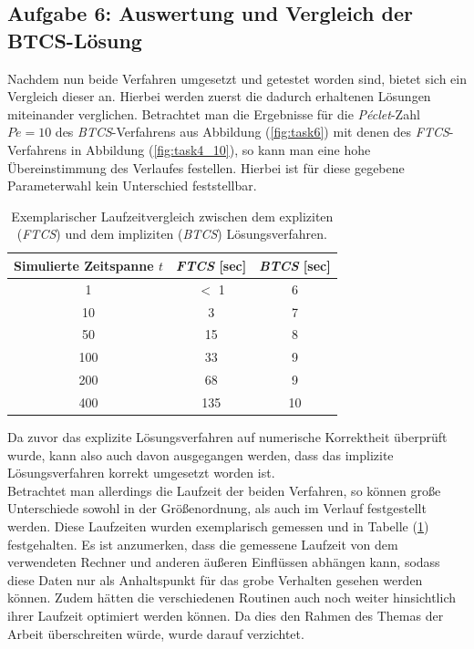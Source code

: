 \documentclass[12pt,a4paper,titlepage,headinclude,bibtotoc]{scrartcl}
\begin{document}
\subsection{Aufgabe 6: Auswertung und Vergleich der BTCS-Lösung}
\label{sec:disc_speed_comparison}
Nachdem nun beide Verfahren umgesetzt und getestet worden sind, bietet sich ein Vergleich dieser an. Hierbei werden zuerst die dadurch erhaltenen Lösungen miteinander verglichen. Betrachtet man die Ergebnisse für die \textit{Péclet}-Zahl $Pe = 10$ des \textit{BTCS}-Verfahrens aus Abbildung (\ref{fig:task6}) mit denen des \textit{FTCS}-Verfahrens in Abbildung (\ref{fig:task4_10}), so kann man eine hohe Übereinstimmung des Verlaufes festellen. Hierbei ist für diese gegebene Parameterwahl kein Unterschied feststellbar.
\begin{table}[H]
	\centering
	\begin{tabular}{c|c|c}
		Simulierte Zeitspanne $t$ & \textit{FTCS} [sec] & \textit{BTCS} [sec] \\ 
		\hline  \hline 
		1 & $<$ 1 & 6 \\ 
		\hline 
		10 & 3 & 7 \\ 
		\hline 
		50 & 15 & 8 \\ 
		\hline 
		100 & 33 & 9 \\ 
		\hline 
		200 & 68 & 9 \\ 
		\hline 
		400 & 135 & 10 \\ 
		\hline 
	\end{tabular}
	\label{table:speed_comparison} 
	\caption{Exemplarischer Laufzeitvergleich zwischen dem expliziten (\textit{FTCS}) und dem impliziten (\textit{BTCS}) Lösungsverfahren.}
\end{table}
Da zuvor das explizite Lösungsverfahren auf numerische Korrektheit überprüft wurde, kann also auch davon ausgegangen werden, dass das implizite Lösungsverfahren korrekt umgesetzt worden ist.\\
Betrachtet man allerdings die Laufzeit der beiden Verfahren, so können große Unterschiede sowohl in der Größenordnung, als auch im Verlauf festgestellt werden. Diese Laufzeiten wurden exemplarisch gemessen und in Tabelle (\ref{table:speed_comparison}) festgehalten. Es ist anzumerken, dass die gemessene Laufzeit von dem verwendeten Rechner und anderen äußeren Einflüssen abhängen kann, sodass diese Daten nur als Anhaltspunkt für das grobe Verhalten gesehen werden können. Zudem hätten die verschiedenen Routinen auch noch weiter hinsichtlich ihrer Laufzeit optimiert werden können. Da dies den Rahmen des Themas der Arbeit überschreiten würde, wurde darauf verzichtet.\\
\end{document}

